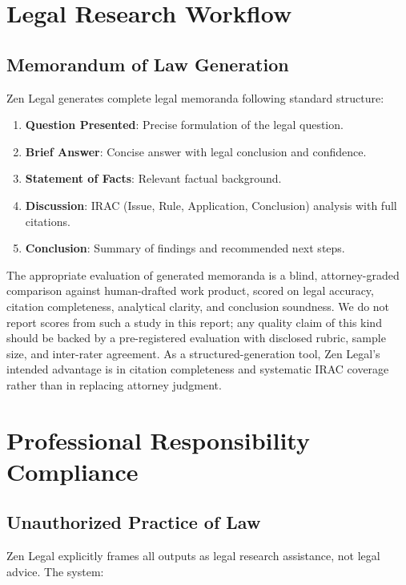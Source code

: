 \documentclass[11pt,a4paper]{article}
\begin{document}
\section{Legal Research Workflow}

\subsection{Memorandum of Law Generation}

Zen Legal generates complete legal memoranda following standard structure:

\begin{enumerate}
  \item \textbf{Question Presented}: Precise formulation of the legal question.
  \item \textbf{Brief Answer}: Concise answer with legal conclusion and confidence.
  \item \textbf{Statement of Facts}: Relevant factual background.
  \item \textbf{Discussion}: IRAC (Issue, Rule, Application, Conclusion) analysis with full citations.
  \item \textbf{Conclusion}: Summary of findings and recommended next steps.
\end{enumerate}

The appropriate evaluation of generated memoranda is a blind, attorney-graded comparison against human-drafted work product, scored on legal accuracy, citation completeness, analytical clarity, and conclusion soundness. We do not report scores from such a study in this report; any quality claim of this kind should be backed by a pre-registered evaluation with disclosed rubric, sample size, and inter-rater agreement. As a structured-generation tool, Zen Legal's intended advantage is in citation completeness and systematic IRAC coverage rather than in replacing attorney judgment.

\section{Professional Responsibility Compliance}

\subsection{Unauthorized Practice of Law}

Zen Legal explicitly frames all outputs as legal research assistance, not legal advice. The system:
\end{document}
